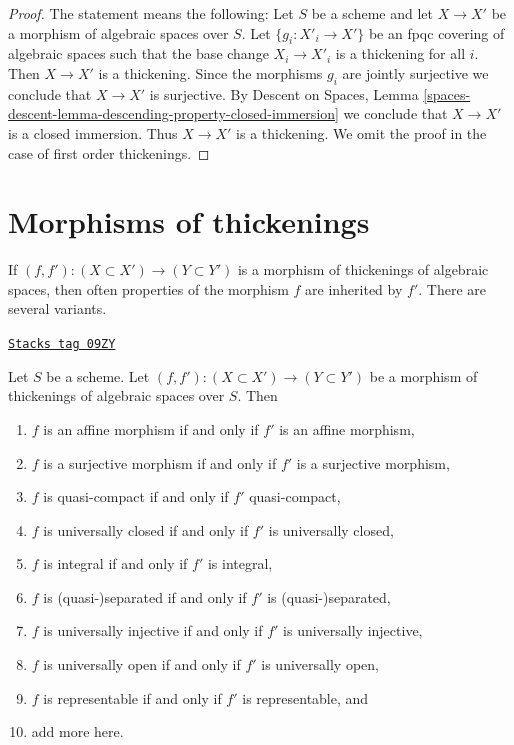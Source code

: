 \begin{proof}
The statement means the following: Let $S$ be a scheme and let
$X \to X'$ be a morphism of algebraic spaces over $S$.
Let $\{g_i : X'_i \to X'\}$ be an fpqc covering of algebraic spaces
such that the base change $X_i \to X'_i$ is a thickening for all $i$.
Then $X \to X'$ is a thickening. Since the morphisms $g_i$ are jointly
surjective we conclude that $X \to X'$ is surjective. By
Descent on Spaces, Lemma
\ref{spaces-descent-lemma-descending-property-closed-immersion}
we conclude that $X \to X'$ is a closed immersion.
Thus $X \to X'$ is a thickening. We omit the proof in the
case of first order thickenings.
\end{proof}

\section{Morphisms of thickenings}
\label{spaces-more-morphisms-section-morphisms-thickenings}
If $(f, f') : (X \subset X') \to (Y \subset Y')$ is a morphism
of thickenings of algebraic spaces, then often properties of the morphism
$f$ are inherited by $f'$. There are several variants.

\begin{lemma}
\label{spaces-more-morphisms-lemma-thicken-property-morphisms}
\href{https://stacks.math.columbia.edu/tag/09ZY}{\texttt{Stacks tag 09ZY}}

Let $S$ be a scheme. Let $(f, f') : (X \subset X') \to (Y \subset Y')$
be a morphism of thickenings of algebraic spaces over $S$. Then
\begin{enumerate}
\item $f$ is an affine morphism if and only if $f'$ is an affine morphism,
\item $f$ is a surjective morphism if and only if $f'$ is a surjective morphism,
\item $f$ is quasi-compact if and only if $f'$ quasi-compact,
\item $f$ is universally closed if and only if $f'$ is universally closed,
\item $f$ is integral if and only if $f'$ is integral,
\item $f$ is (quasi-)separated if and only if $f'$ is (quasi-)separated,
\item $f$ is universally injective if and only if $f'$ is universally injective,
\item $f$ is universally open if and only if $f'$ is universally open,
\item $f$ is representable if and only if $f'$ is representable, and
\item add more here.
\end{enumerate}
\end{lemma}

